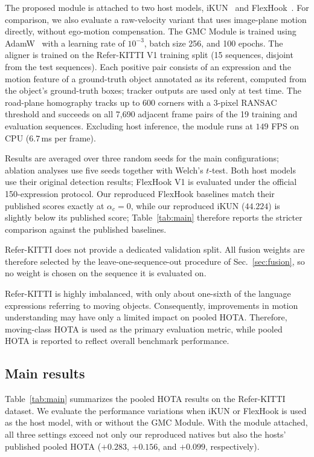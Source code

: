 \documentclass{article}
\begin{document}
The proposed module is attached to two host models, iKUN~\cite{ikun} and FlexHook~\cite{flexhook}. For comparison, we also evaluate a raw-velocity variant that uses image-plane motion directly, without ego-motion compensation. The GMC Module is trained using AdamW~\cite{adamw} with a learning rate of $10^{-3}$, batch size 256, and 100 epochs. The aligner is trained on the Refer-KITTI V1 training split (15 sequences, disjoint from the test sequences). Each positive pair consists of an expression and the motion feature of a ground-truth object annotated as its referent, computed from the object's ground-truth boxes; tracker outputs are used only at test time. The road-plane homography tracks up to 600 corners with a 3-pixel RANSAC threshold and succeeds on all 7,690 adjacent frame pairs of the 19 training and evaluation sequences. Excluding host inference, the module runs at $149$ FPS on CPU ($6.7$\,ms per frame).

Results are averaged over three random seeds for the main configurations; ablation analyses use five seeds together with Welch's $t$-test. Both host models use their original detection results; FlexHook V1 is evaluated under the official 150-expression protocol. Our reproduced FlexHook baselines match their published scores exactly at $\alpha_c{=}0$, while our reproduced iKUN ($44.224$) is slightly below its published score; Table~\ref{tab:main} therefore reports the stricter comparison against the published baselines.

Refer-KITTI does not provide a dedicated validation split. All fusion weights are therefore selected by the leave-one-sequence-out procedure of Sec.~\ref{sec:fusion}, so no weight is chosen on the sequence it is evaluated on.

Refer-KITTI is highly imbalanced, with only about one-sixth of the language expressions referring to moving objects. Consequently, improvements in motion understanding may have only a limited impact on pooled HOTA. Therefore, moving-class HOTA is used as the primary evaluation metric, while pooled HOTA is reported to reflect overall benchmark performance.

\subsection{Main results}
\label{sec:main}
Table~\ref{tab:main} summarizes the pooled HOTA results on the Refer-KITTI dataset. We evaluate the performance variations when iKUN or FlexHook is used as the host model, with or without the GMC Module. With the module attached, all three settings exceed not only our reproduced natives but also the hosts' published pooled HOTA ($+0.283$, $+0.156$, and $+0.099$, respectively).
\end{document}
